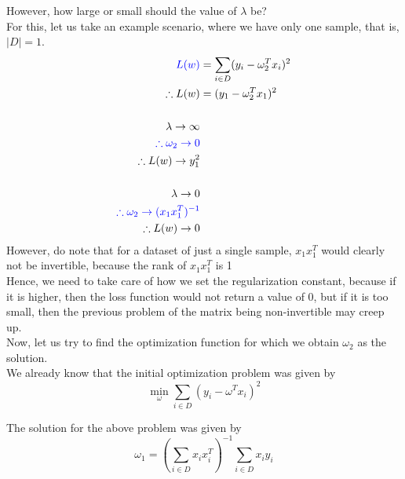 \documentclass[11pt, twosides]{article}
\begin{document}
However, how large or small should the value of $\lambda$ be?\\
For this, let us take an example scenario, where we have only one sample, that is, $|D| = 1$.
\begin{align*}
\color{blue}
    L(w) &= \sum_{i \in D} (y_i - \omega_2^T x_i)^2\\
    \therefore L(w) &= (y_1 - \omega_2^T x_1)^2\\
    \\ 
    \color{black}
    \lambda \rightarrow \infty\\ 
    \color{blue}
    \therefore \omega_2 \rightarrow 0\\
    \therefore L(w) \rightarrow y_1^2\\
    \\ 
    \color{black}
    \lambda \rightarrow 0\\ 
    \color{blue}
    \therefore \omega_2 \rightarrow (x_1x_1^T)^{-1}\\
    \therefore L(w) \rightarrow 0\\
\end{align*}
\color{black}
However, do note that for a dataset of just a single sample, $x_1x_1^T$ would clearly not be invertible, because the rank of $x_1x_1^T$ is 1\\
Hence, we need to take care of how we set the regularization constant, because if it is higher, then the loss function would not return a value of $0$, but if it is too small, then the previous problem of the matrix being non-invertible may creep up.\\

Now, let us try to find the optimization function for which we obtain $\omega_2$ as the solution.\\

We already know that the initial optimization problem was given by
\begin{equation*}
    \min_{\omega} \sum_{i \in D} (y_i - \omega^T x_i)^2 
\end{equation*}

The solution for the above problem was given by
\begin{equation*}
    \omega_1 = (\sum_{i \in D} x_ix_i^T)^{-1} \sum_{i \in D} x_iy_i
\end{equation*}
\end{document}
